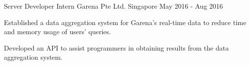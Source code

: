 \begin{cventries}
  \cventry
  {Server Developer Intern} %
  {Garena Pte Ltd.} %
  {Singapore} %
  {May 2016 - Aug 2016} %
  {
    \begin{cvitems} %
    \item {Established a data aggregation system for Garena's real-time data to reduce time and memory usage of users' queries.}
    \item {Developed an API to assist programmers in obtaining results from the data aggregation system.}
    \end{cvitems}
  }

\end{cventries}

